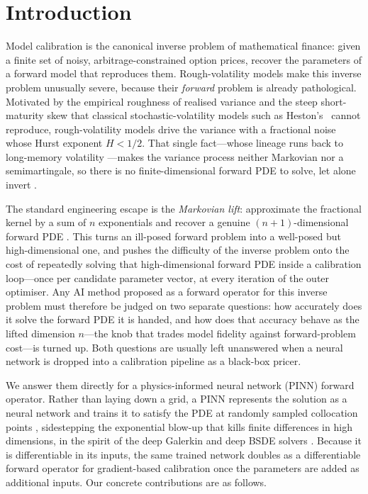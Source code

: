 \documentclass[preprint,12pt]{elsarticle}
\begin{document}
\section{Introduction}
\label{sec:intro}

Model calibration is the canonical inverse problem of mathematical finance: given
a finite set of noisy, arbitrage-constrained option prices, recover the
parameters of a forward model that reproduces them. Rough-volatility models make
this inverse problem unusually severe, because their \emph{forward} problem is
already pathological. Motivated by the empirical roughness of realised variance
\citep{gatheral2018volatility,bennedsen2022decoupling} and the steep
short-maturity skew that classical stochastic-volatility models such as
Heston's~\citep{heston1993closed} cannot reproduce, rough-volatility models drive the
variance with a fractional noise whose Hurst exponent $H<1/2$. That single
fact---whose lineage runs back to long-memory volatility
\citep{comte1998long}---makes the variance process neither Markovian nor a
semimartingale, so there is no finite-dimensional forward PDE to solve, let alone
invert \citep{gatheral2018volatility,eleuch2019characteristic}.

The standard engineering escape is the \emph{Markovian lift}: approximate the
fractional kernel by a sum of $n$ exponentials and recover a genuine
$(n{+}1)$-dimensional forward PDE \citep{abijaber2019multifactor,abijaber2019lifting}.
This turns an ill-posed forward problem into a well-posed but high-dimensional
one, and pushes the difficulty of the inverse problem onto the cost of repeatedly
solving that high-dimensional forward PDE inside a calibration loop---once per
candidate parameter vector, at every iteration of the outer optimiser. Any AI
method proposed as a forward operator for this inverse problem must therefore be
judged on two separate questions: how accurately does it solve the forward PDE it
is handed, and how does that accuracy behave as the lifted dimension $n$---the
knob that trades model fidelity against forward-problem cost---is turned up. Both
questions are usually left unanswered when a neural network is dropped into a
calibration pipeline as a black-box pricer.

We answer them directly for a physics-informed neural network (PINN) forward
operator. Rather than laying down a grid, a PINN represents the solution as a
neural network and trains it to satisfy the PDE at randomly sampled collocation
points \citep{raissi2019physics}, sidestepping the exponential blow-up that
kills finite differences in high dimensions, in the spirit of the deep Galerkin
and deep BSDE solvers \citep{sirignano2018dgm,han2018solving}. Because it is
differentiable in its inputs, the same trained network doubles as a
differentiable forward operator for gradient-based calibration once the
parameters are added as additional inputs. Our concrete contributions are as
follows.
\end{document}
